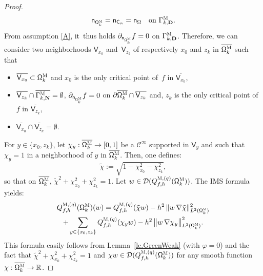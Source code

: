 \documentclass[JEP,XML,SOM,Unicode,NoEqCountersInSection,NoFloatCountersInSection,published]{cedram}
\newcommand{\mbf}[1]{\mathbf{#1}}
\let\pa\partial
\theoremstyle{plain}
\theoremstyle{definition}
\begin{document}
\begin{proof}
\begin{equation}\label{eq.=normaCalpha}
\mathsf n_{{\mathsf \Omega_k^{\textsc{M}}}}=\mathsf n_{ \mathsf C_\alpha}=\mathsf n_{ \Omega}\quad \text{on }\Gamma_{k,\mbf D}^{\textsc{M}}.
\end{equation}
From assumption \ref{A}, it~thus holds $\partial_{\mathsf n_{ \mathsf \Omega_k^{\textsc{M}}}}f=0$ on $\Gamma_{k,\mbf D}^{\textsc{M}}$.
Therefore, we can consider two neighborhoods $\mathsf V_{x_0}$ and~$\mathsf V_{z_k}$ of respectively $x_0$ and $z_k$ in $\overline {\mathsf \Omega_k^{\textsc{M}}}$ such that
\begin{itemize}
\item
$\overline{\mathsf V_{x_0}}\subset {\mathsf \Omega_k^{\textsc{M}}}$ and $x_0$ is the only critical point of~$f$ in $\overline{\mathsf V_{x_0}}$,
\item
$\overline {\mathsf V_{z_k}} \cap \overline{\Gamma_{k,\mbf N}^{\textsc{M}}}=\emptyset$, $ \partial_{\mathsf n_{ \mathsf \Omega_k^{\textsc{M}}}}f=0$ on $\pa\overline {\mathsf \Omega_k^{\textsc{M}}} \cap\overline {\mathsf V_{z_k}}$
and, $z_k$ is the only critical point of~$f$ in $\overline {\mathsf V_{z_k}}$,
\item
$\overline{\mathsf V_{x_0}}\cap \overline {\mathsf V_{z_k}}=\emptyset$.
\end{itemize}
For $y\in \{x_0,z_k\}$, let $\chi_y: \overline {\mathsf \Omega_k^{\textsc{M}}}\to [0,1]$ be a $\mathcal C^\infty$ supported in $\mathsf V_y$ and such that $\chi_y=1$ in a neighborhood of $y$ in $\overline {\mathsf \Omega_k^{\textsc{M}}}$.
Then, one defines:\vspace*{-3pt}
\[
\tilde \chi:=\sqrt{1- \chi_{x_0}^2-\chi_{z_k}^2},
\]
so that on $\overline {\mathsf \Omega_k^{\textsc{M}}}$, $\tilde \chi^2+\chi_{x_0}^2+\chi_{z_k}^2=1$.
Let $w\in \mathcal D(Q_{f,h}^{\textsc{M},(q)}(\mathsf \Omega_k^{\textsc{M}}))$.
The IMS formula~\cite{CFKS,helffer-nier-06} yields:\vspace*{-5pt}
\begin{multline*}
Q_{f,h}^{\textsc{M},(q)}(\mathsf \Omega_k^{\textsc{M}})(w) = Q_{f,h}^{\textsc{M},(q)}(\tilde \chi w) - h^2\, \Vert w\, \nabla \tilde \chi \Vert_{L^2(\mathsf \Omega_k^{\textsc{M}})}^2\\
+ \sum_{y\in \{x_0,z_k\}} Q_{f,h}^{\textsc{M},(q)}(\chi_y w) - h^2\,\big \Vert w\, \nabla \chi_y \big \Vert_{L^2(\mathsf \Omega_k^{\textsc{M}})}^2.
\end{multline*}
This formula easily follows from Lemma~\ref{le.GreenWeak} (with $\varphi=0$) and the fact that $\tilde \chi^2+\chi_{x_0}^2+\chi_{z_k}^2=1$ and $\chi w\in \mathcal D(Q_{f,h}^{\textsc{M},(q)}(\mathsf \Omega_k^{\textsc{M}}))$ for any smooth function $\chi:\overline {\mathsf \Omega_k^{\textsc{M}}}\to \mathbb R$.


\end{proof}
\end{document}
